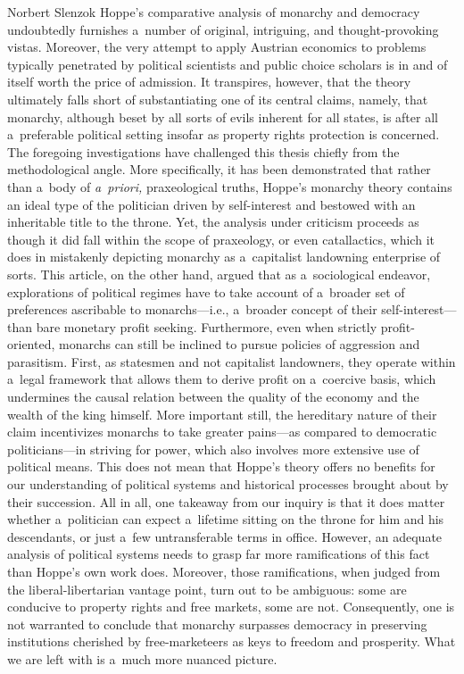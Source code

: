 \begin{artengenv}{Norbert Slenzok}
Hoppe's comparative analysis of monarchy and democracy undoubtedly furnishes a~number of original, intriguing, and thought-provoking vistas. Moreover, the very attempt to apply Austrian economics to problems typically penetrated by political scientists and public choice scholars is in and of itself worth the price of admission. It transpires, however, that the theory ultimately falls short of substantiating one of its central claims, namely, that monarchy, although beset by all sorts of evils inherent for all states, is after all a~preferable political setting insofar as property rights protection is concerned. The foregoing investigations have challenged this thesis chiefly from the methodological angle. More specifically, it has been demonstrated that rather than a~body of \textit{a~priori,} praxeological truths, Hoppe's monarchy theory contains an ideal type of the politician driven by self-interest and bestowed with an inheritable title to the throne. Yet, the analysis under criticism proceeds as though it did fall within the scope of praxeology, or even catallactics, which it does in mistakenly depicting monarchy as a~capitalist landowning enterprise of sorts. This article, on the other hand, argued that as a~sociological endeavor, explorations of political regimes have to take account of a~broader set of preferences ascribable to monarchs---i.e., a~broader concept of their self-interest---than bare monetary profit seeking. Furthermore, even when strictly profit-oriented, monarchs can still be inclined to pursue policies of aggression and parasitism. First, as statesmen and not capitalist landowners, they operate within a~legal framework that allows them to derive profit on a~coercive basis, which undermines the causal relation between the quality of the economy and the wealth of the king himself. More important still, the hereditary nature of their claim incentivizes monarchs to take greater pains---as compared to democratic politicians---in striving for power, which also involves more extensive use of political means. This does not mean that Hoppe's theory offers no benefits for our understanding of political systems and historical processes brought about by their succession. All in all, one takeaway from our inquiry is that it does matter whether a~politician can expect a~lifetime sitting on the throne for him and his descendants, or just a~few untransferable terms in office. However, an adequate analysis of political systems needs to grasp far more ramifications of this fact than Hoppe's own work does. Moreover, those ramifications, when judged from the liberal-libertarian vantage point, turn out to be ambiguous: some are conducive to property rights and free markets, some are not. Consequently, one is not warranted to conclude that monarchy surpasses democracy in preserving institutions cherished by free-marketeers as keys to freedom and prosperity. What we are left with is a~much more nuanced picture.









\end{artengenv}

